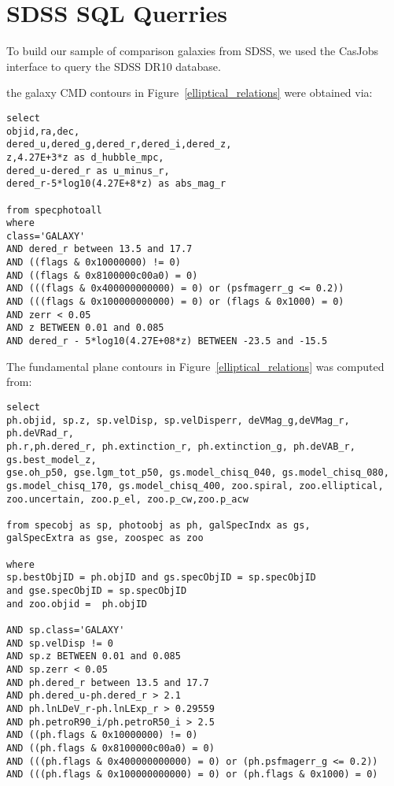 \documentclass[12pt,preprint]{aastex}
\begin{document}



\clearpage

\appendix
\section{SDSS SQL Querries} \label{SQL}
To build our sample of comparison galaxies from SDSS, we used the CasJobs interface to query the SDSS DR10 database.


the galaxy CMD contours in Figure~\ref{elliptical_relations} were obtained via:
\begin{verbatim}
select 
objid,ra,dec,
dered_u,dered_g,dered_r,dered_i,dered_z,
z,4.27E+3*z as d_hubble_mpc,
dered_u-dered_r as u_minus_r,
dered_r-5*log10(4.27E+8*z) as abs_mag_r 

from specphotoall
where
class='GALAXY'
AND dered_r between 13.5 and 17.7
AND ((flags & 0x10000000) != 0)
AND ((flags & 0x8100000c00a0) = 0)
AND (((flags & 0x400000000000) = 0) or (psfmagerr_g <= 0.2))
AND (((flags & 0x100000000000) = 0) or (flags & 0x1000) = 0)
AND zerr < 0.05
AND z BETWEEN 0.01 and 0.085
AND dered_r - 5*log10(4.27E+08*z) BETWEEN -23.5 and -15.5
\end{verbatim}


The fundamental plane contours in Figure~\ref{elliptical_relations} was computed from:
\begin{verbatim}
select
ph.objid, sp.z, sp.velDisp, sp.velDisperr, deVMag_g,deVMag_r, ph.deVRad_r, 
ph.r,ph.dered_r, ph.extinction_r, ph.extinction_g, ph.deVAB_r,  gs.best_model_z, 
gse.oh_p50, gse.lgm_tot_p50, gs.model_chisq_040, gs.model_chisq_080, 
gs.model_chisq_170, gs.model_chisq_400, zoo.spiral, zoo.elliptical, 
zoo.uncertain, zoo.p_el, zoo.p_cw,zoo.p_acw 

from specobj as sp, photoobj as ph, galSpecIndx as gs, 
galSpecExtra as gse, zoospec as zoo

where
sp.bestObjID = ph.objID and gs.specObjID = sp.specObjID 
and gse.specObjID = sp.specObjID 
and zoo.objid =  ph.objID 

AND sp.class='GALAXY'
AND sp.velDisp != 0
AND sp.z BETWEEN 0.01 and 0.085
AND sp.zerr < 0.05
AND ph.dered_r between 13.5 and 17.7
AND ph.dered_u-ph.dered_r > 2.1
AND ph.lnLDeV_r-ph.lnLExp_r > 0.29559
AND ph.petroR90_i/ph.petroR50_i > 2.5
AND ((ph.flags & 0x10000000) != 0)
AND ((ph.flags & 0x8100000c00a0) = 0)
AND (((ph.flags & 0x400000000000) = 0) or (ph.psfmagerr_g <= 0.2))
AND (((ph.flags & 0x100000000000) = 0) or (ph.flags & 0x1000) = 0)
\end{verbatim}
\end{document}
